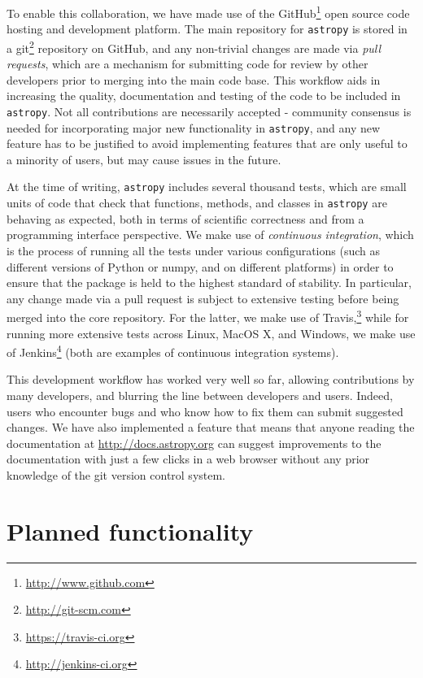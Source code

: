 \documentclass[traditabstract]{aa}
\newcommand{\astropy}{\texttt{astropy}\xspace}
\begin{document}
To enable this collaboration, we have made use of the
GitHub\footnote{\url{http://www.github.com}} open source code hosting and
development  platform. The main repository for \astropy is stored in a
git\footnote{\url{http://git-scm.com}} repository on GitHub, and any
non-trivial changes are made via \textit{pull requests}, which are a mechanism
for submitting code for review by other developers prior to merging into the
main code base. This workflow aids in increasing the quality, documentation and
testing of the code to be included in \astropy. Not all contributions are
necessarily accepted - community consensus is needed for incorporating major
new functionality in \astropy, and any new feature has to be justified to avoid
implementing features that are only useful to a minority of users, but may
cause issues in the future.

At the time of writing, \astropy includes several thousand tests, which are
small units of code that check that functions, methods, and classes in \astropy
are behaving as expected, both in terms of scientific correctness and from a
programming interface perspective. We make use of \textit{continuous
integration}, which is the process of running all the tests under various
configurations (such as different versions of Python or \gls{numpy}, and on different
platforms) in order to ensure that the package is held to the highest standard
of stability. In particular, any change made via a pull request is subject to
extensive testing before being merged into the core repository. For the latter,
we make use of Travis,\footnote{\url{https://travis-ci.org}} while for running
more extensive tests across Linux, MacOS X, and Windows, we make use of
Jenkins\footnote{\url{http://jenkins-ci.org}} (both are examples of continuous
integration systems).

This development workflow has worked very well so far, allowing contributions
by many developers, and blurring the line between developers and users. Indeed,
users who encounter bugs and who know how to fix them can submit suggested
changes. We have also implemented a feature that means that anyone reading the
documentation at \url{http://docs.astropy.org} can suggest improvements to the
documentation with just a few clicks in a web browser without any prior
knowledge of the git version control system.

\section{Planned functionality}
\end{document}
